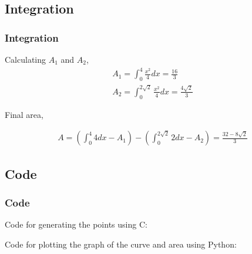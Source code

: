 \documentclass{beamer}
\providecommand{\brak}[1]{\ensuremath{\left(#1\right)}}
\theoremstyle{remark}
\numberwithin{equation}{section}
\begin{document}
\subsection{Integration}
\begin{frame}
\frametitle{Integration}

Calculating $A_1$ and $A_2$,
\begin{align}
A_1 = \int_0^4 \frac{x^2}{4} dx = \frac{16}{3}\\
A_2 = \int_0^{2\sqrt{2}} \frac{x^2}{4} dx = \frac{4\sqrt{2}}{3}
\end{align}

Final area,

\begin{align}
A = \brak{\int_0^4 4 dx - A_1} - \brak{\int_0^{2\sqrt{2}}2 dx - A_2} = \frac{32-8\sqrt{2}}{3}
\end{align}

\end{frame}
\subsection{Code}
\begin{frame}
    \frametitle{Code}
    Code for generating the points using C:
    
    
    Code for plotting the graph of the curve and area using Python:
    
\end{frame}
\end{document}
